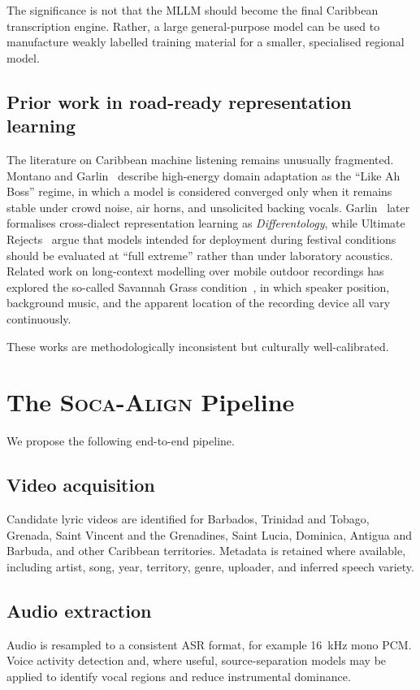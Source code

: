 \documentclass[10pt,twocolumn]{article}
\begin{document}
The significance is not that the MLLM should become the final Caribbean transcription engine. Rather, a large general-purpose model can be used to manufacture weakly labelled training material for a smaller, specialised regional model.

\subsection{Prior work in road-ready representation learning}
The literature on Caribbean machine listening remains unusually fragmented. Montano and Garlin~\cite{montano2015boss} describe high-energy domain adaptation as the ``Like Ah Boss'' regime, in which a model is considered converged only when it remains stable under crowd noise, air horns, and unsolicited backing vocals. Garlin~\cite{garlin2013differentology} later formalises cross-dialect representation learning as \emph{Differentology}, while Ultimate Rejects~\cite{rejects2017fullextreme} argue that models intended for deployment during festival conditions should be evaluated at ``full extreme'' rather than under laboratory acoustics. Related work on long-context modelling over mobile outdoor recordings has explored the so-called Savannah Grass condition~\cite{kes2019savannah}, in which speaker position, background music, and the apparent location of the recording device all vary continuously.

These works are methodologically inconsistent but culturally well-calibrated.

\section{The \textsc{Soca-Align} Pipeline}
We propose the following end-to-end pipeline.

\subsection{Video acquisition}
Candidate lyric videos are identified for Barbados, Trinidad and Tobago, Grenada, Saint Vincent and the Grenadines, Saint Lucia, Dominica, Antigua and Barbuda, and other Caribbean territories. Metadata is retained where available, including artist, song, year, territory, genre, uploader, and inferred speech variety.

\subsection{Audio extraction}
Audio is resampled to a consistent ASR format, for example 16~kHz mono PCM. Voice activity detection and, where useful, source-separation models may be applied to identify vocal regions and reduce instrumental dominance.
\end{document}
